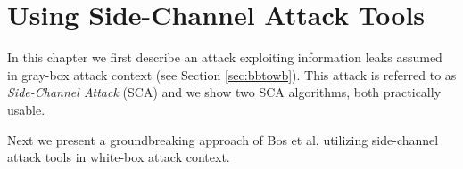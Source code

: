 \chapter{Using Side-Channel Attack Tools}
\label{chap:attack}

In this chapter we first describe an attack exploiting information leaks assumed in gray-box attack context (see Section \ref{sec:bbtowb}). This attack is referred to as {\em Side-Channel Attack} (SCA) and we show two SCA algorithms, both practically usable.

Next we present a groundbreaking approach of Bos et al. \cite{bos2015differential} utilizing side-channel attack tools in white-box attack context.





